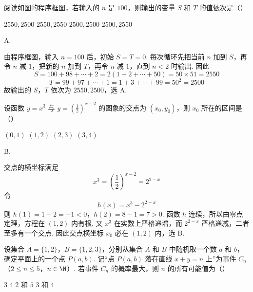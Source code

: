 \begin{problem}
阅读如图的程序框图，若输入的 \(n\) 是 \(100\)，则输出的变量 \(S\) 和 \(T\) 的值依次是（\quad）


\choices
    {\(2550, 2500\)}
    {\(2550, 2550\)}
    {\(2500, 2500\)}
    {\(2500, 2550\)}
\end{problem}

\begin{answer}
A.
\end{answer}

\begin{solution}
由程序框图，输入 \(n=100\) 后，初始 \(S=T=0\). 每次循环先把当前 \(n\) 加到 \(S\)，再令 \(n\) 减 \(1\)，把新的 \(n\) 加到 \(T\)，再令 \(n\) 减 \(1\)，直到 \(n<2\) 时输出. 因此
\[
S=100+98+\cdots+2=2(1+2+\cdots+50)=50\times51=2550
\]
\[
T=99+97+\cdots+1=1+3+\cdots+99=50^2=2500
\]
故输出的 \(S\)，\(T\) 依次为 \(2550,2500\)，选 A.
\end{solution}

\begin{problem}
设函数 \( y = x^3 \) 与 \( y = \left(\frac{1}{2}\right)^{x - 2} \) 的图象的交点为 \( (x_0, y_0) \)，则 \( x_0 \) 所在的区间是（\quad）

\choices
    {\((0,1)\)}
    {\((1,2)\)}
    {\((2,3)\)}
    {\((3,4)\)}
\end{problem}

\begin{answer}
B.
\end{answer}

\begin{solution}
交点的横坐标满足
\[
x^3=\left(\frac12\right)^{x-2}=2^{2-x}
\]
令
\[
h(x)=x^3-2^{2-x}
\]
则
\(h(1)=1-2=-1<0\)，\(h(2)=8-1=7>0\).
函数 \(h\) 连续，所以由零点定理，方程在 \((1,2)\) 内有根. 又 \(x^3\) 在实数上严格递增，而 \(2^{2-x}\) 严格递减，二者至多有一个交点. 因此交点横坐标 \(x_0\) 必在 \((1,2)\) 内，选 B.
\end{solution}

\begin{problem}
设集合 \(A = \{1, 2\}\)，\(B = \{1, 2, 3\}\)，分别从集合 \(A\) 和 \(B\) 中随机取一个数 \(a\) 和 \(b\)，确定平面上的一个点 \(P(a, b)\). 记“点 \(P(a, b)\) 落在直线 \(x + y = n\) 上”为事件 \(C_n\) （\(2 \leqslant n \leqslant 5\)，\(n \in \N\)）. 若事件 \(C_n\) 的概率最大，则 \(n\) 的所有可能值为（\quad）

\choices
    {\(3\)}
    {\(4\)}
    {\(2\) 和 \(5\)}
    {\(3\) 和 \(4\)}
\end{problem}

